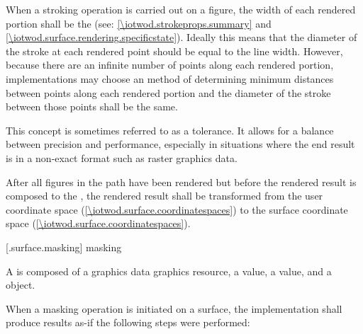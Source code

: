 \pnum
When a stroking operation is carried out on a figure, the width of each rendered portion shall be the  (see: \ref{\iotwod.strokeprops.summary} and \ref{\iotwod.surface.rendering.specificstate}). Ideally this means that the diameter of the stroke at each rendered point should be equal to the line width. However, because there are an infinite number of points along each rendered portion, implementations may choose an \unspecnorm method of determining minimum distances between points along each rendered portion and the diameter of the stroke between those points shall be the same.
\begin{note}
This concept is sometimes referred to as a tolerance. It allows for a balance between precision and performance, especially in situations where the end result is in a non-exact format such as raster graphics data.
\end{note}

\pnum
After all figures in the path have been rendered but before the rendered result is composed to the \underlyingsurface, the rendered result shall be transformed from the user coordinate space (\ref{\iotwod.surface.coordinatespaces}) to the surface coordinate space (\ref{\iotwod.surface.coordinatespaces}).

 [\iotwod.surface.masking] { masking}

\pnum
A  is composed of a graphics data graphics resource, a  value, a  value, and a  object.

\pnum
When a masking operation is initiated on a surface, the implementation shall produce results as-if the following steps were performed:

